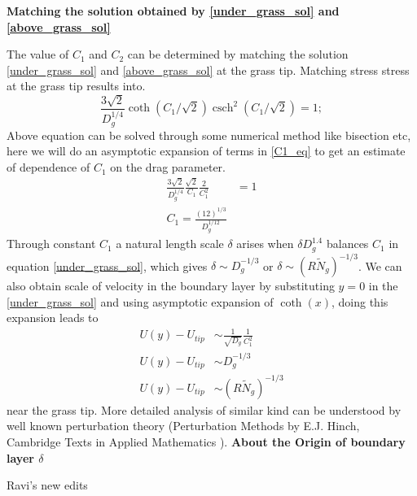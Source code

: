 \documentclass[letterpaper,10pt]{article}
\newcommand{\Ndg}{\tilde{N}_g}
\DeclareMathOperator{\csch}{csch}
\begin{document}
\textbf{Matching the solution obtained by \eqref{under_grass_sol} and \eqref{above_grass_sol} }

The value of $C_1$ and $C_2$ can be determined by matching the solution \eqref{under_grass_sol} and \eqref{above_grass_sol} at the grass tip.
Matching stress stress at the grass tip results into.
\begin{equation}
\frac{3\sqrt{2}}{D_g^{1/4}} \coth(C_1/\sqrt{2}) \csch^2(C_1/\sqrt{2}) = 1;
\label{C1_eq}
\end{equation}
Above equation can be solved through some numerical method like bisection etc, here we will do an asymptotic expansion of terms in \eqref{C1_eq} to get an estimate of dependence of $C_1$ on the drag parameter.
\begin{equation}
\begin{split}
\frac{3\sqrt{2}}{D_g^{1/4}} \frac{\sqrt{2}}{C_1} \frac{2}{C_1^2} &= 1 \\
C_1 = \frac{(12)^{1/3}}{D_g^{1/12}}
\end{split}
\end{equation}
Through constant $C_1$ a natural length scale $\delta$ arises when $\delta D_g^{1.4}$ balances $C_1$ in equation \eqref{under_grass_sol}, which gives $\delta \sim D_g^{-1/3}$ or $\delta \sim (R\Ndg)^{-1/3}$. We can also obtain scale of velocity in the boundary layer by substituting $y=0$ in the \eqref{under_grass_sol} and using asymptotic expansion of $\coth(x)$, doing this expansion leads to 
\begin{equation}
\begin{split}
U(y)-U_{tip} &\sim \frac{1}{\sqrt{D_g}}\frac{1}{C_1^2}\\
U(y)-U_{tip} &\sim D_g^{-1/3}\\
U(y)-U_{tip} &\sim (R\Ndg)^{-1/3}
\end{split}
\end{equation}
near the grass tip. More detailed analysis of similar kind can be understood by well known perturbation theory (Perturbation Methods by E.J. Hinch, Cambridge Texts in Applied Mathematics ).
\newline
\textbf{ About the Origin of boundary layer $\delta$}

\centerline{Ravi's new edits}
\end{document}
